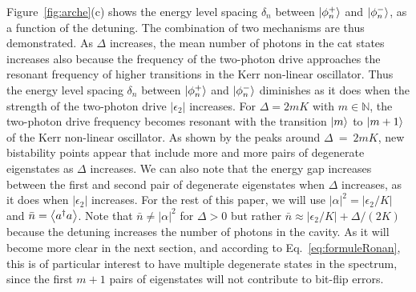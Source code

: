 \documentclass[%
 reprint,
 superscriptaddress,
 amsmath,
 amssymb,
 aps,
 pra,
 10pt
]{revtex4-2}
\begin{document}
Figure~\ref{fig:arche}(c) shows the energy level spacing $\delta_n$ between $\ket{{\phi}_n^+}$ and $\ket{{\phi}_n^-}$, as a function of the detuning. The combination of two mechanisms are thus demonstrated. As $\Delta$ increases, the mean number of photons in the cat states increases also because the frequency of the two-photon drive approaches the resonant frequency of higher transitions in the Kerr non-linear oscillator. Thus the energy level spacing $\delta_n$ between $\ket{{\phi}_n^+}$ and $\ket{{\phi}_n^-}$ diminishes as it does when the strength of the two-photon drive $|\epsilon_2|$ increases. For $\Delta = 2mK$ with $m \in \mathbb{N}$, the two-photon drive frequency becomes resonant with the transition $\ket{m}$ to $\ket{m+1}$ of the Kerr non-linear oscillator. As shown by the peaks around $\Delta~=~2mK$, new bistability points appear that include more and more pairs of degenerate eigenstates as $\Delta$ increases. We can also note that the energy gap increases between the first and second pair of degenerate eigenstates when $\Delta$ increases, as it does when $|\epsilon_2|$ increases. For the rest of this paper, we will use $|\alpha|^2 = |\epsilon_2/K|$ and $\bar{n} = \expval{a^\dagger a}$. Note that $\bar{n} \ne |\alpha|^2$ for $\Delta >0$ but rather $\bar{n} \approx |\epsilon_2/K|+\Delta/(2K)$ because the detuning increases the number of photons in the cavity. As it will become more clear in the next section, and according to Eq.~\eqref{eq:formuleRonan}, this is of particular interest to have multiple degenerate states in the spectrum, since the first $m +1$ pairs of eigenstates will not contribute to bit-flip errors.
\end{document}
